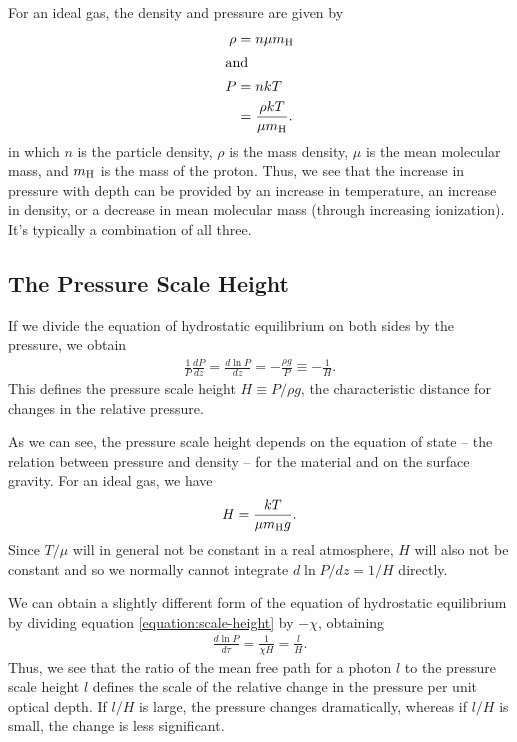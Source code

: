 For an ideal gas, the density and pressure are given by
\begin{align}
\rho &= n\mu m_\mathrm{H}\\
\intertext{and}
P &= nkT\\
&= \frac{\rho kT}{\mu m_\mathrm{H}}.
\end{align}
in which $n$ is the particle density, $\rho$ is the mass density, $\mu$ is the mean molecular mass, and $m_\mathrm{H}$ is the mass of the proton. Thus, we see that the increase in pressure with depth can be provided by an increase in temperature, an increase in density, or a decrease in mean molecular mass (through increasing ionization). It’s typically a combination of all three.

\newslide

\subsection{The Pressure Scale Height}

If we divide the equation of hydrostatic equilibrium on both sides by the pressure, we obtain
\begin{align}
\frac{1}{P} \frac{dP}{dz} = \frac{d\ln P}{dz} = -\frac{\rho g}{P} \equiv -\frac{1}{H}.
\label{equation:scale-height}
\end{align}
This defines the pressure scale height $H \equiv P/\rho g$, the characteristic distance for changes in the relative pressure. 

As we can see, the pressure scale height depends on the equation of state -- the relation between pressure and density -- for the material and on the surface gravity. For an ideal gas, we have
\begin{align}
H = \frac{kT}{\mu m_\mathrm{H} g}.
\end{align}
Since $T/\mu$ will in general not be constant in a real atmosphere, $H$ will also not be constant and so we normally cannot integrate $d\ln P/dz = 1/H$ directly.

We can obtain a slightly different form of the equation of hydrostatic equilibrium by dividing equation \ref{equation:scale-height} by $-\chi$, obtaining
\begin{align}
\frac{d\ln P}{d\tau} = \frac{1}{\chi H} = \frac{l}{H}.
\end{align}
Thus, we see that the ratio of the mean free path for a photon $l$ to the pressure scale height $l$ defines the scale of the relative change in the pressure per unit optical depth. If $l/H$ is large, the pressure changes dramatically, whereas if $l/H$ is small, the change is less significant.

